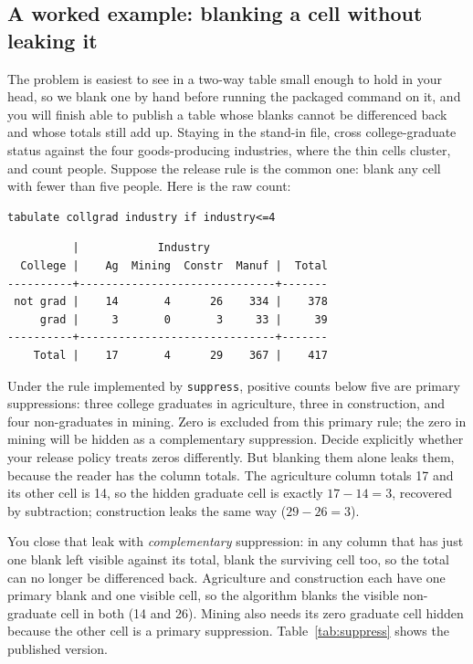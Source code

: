\subsection{A worked example: blanking a cell without leaking it}\label{sec:supexample}
The problem is easiest to see in a two-way table small enough to hold in your head, so we blank one by hand before running the packaged command on it, and you will finish able to publish a table whose blanks cannot be differenced back and whose totals still add up. Staying in the stand-in file, cross college-graduate status against the four goods-producing industries, where the thin cells cluster, and count people. Suppose the release rule is the common one: blank any cell with fewer than five people. Here is the raw count:
\par
{\footnotesize
\begin{verbatim}
tabulate collgrad industry if industry<=4
\end{verbatim}
}
\par
{\footnotesize
\begin{verbatim}
          |            Industry
  College |    Ag  Mining  Constr  Manuf |  Total
----------+------------------------------+-------
 not grad |    14       4      26    334 |    378
     grad |     3       0       3     33 |     39
----------+------------------------------+-------
    Total |    17       4      29    367 |    417
\end{verbatim}
}
Under the rule implemented by \texttt{suppress}, positive counts below five are primary suppressions: three college graduates in agriculture, three in construction, and four non-graduates in mining. Zero is excluded from this primary rule; the zero in mining will be hidden as a complementary suppression. Decide explicitly whether your release policy treats zeros differently. But blanking them alone leaks them, because the reader has the column totals. The agriculture column totals 17 and its other cell is 14, so the hidden graduate cell is exactly $17-14=3$, recovered by subtraction; construction leaks the same way ($29-26=3$). 

You close that leak with \emph{complementary} suppression: in any column that has just one blank left visible against its total, blank the surviving cell too, so the total can no longer be differenced back. Agriculture and construction each have one primary blank and one visible cell, so the algorithm blanks the visible non-graduate cell in both (14 and 26). Mining also needs its zero graduate cell hidden because the other cell is a primary suppression. Table~\ref{tab:suppress} shows the published version.


